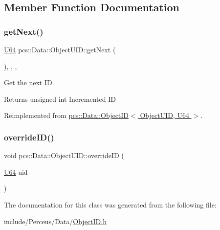 \subsection{Member Function Documentation}
\mbox{\label{classpcs_1_1Data_1_1ObjectUID_a1a1cc75b0ed7e6c04f2f5daa33e0193e}} 
\subsubsection{\texorpdfstring{get\+Next()}{getNext()}}
{\footnotesize\ttfamily \hyperlink{namespacepcs_1_1Data_a9aad6b21cf2fcd3515ecc3bbd069eb34}{U64} pcs\+::\+Data\+::\+Object\+U\+I\+D\+::get\+Next (\begin{DoxyParamCaption}{ }\end{DoxyParamCaption})\hspace{0.3cm}{\ttfamily [inline]}, {\ttfamily [override]}, {\ttfamily [private]}, {\ttfamily [virtual]}}



Get the next ID. 

\begin{DoxyReturn}{Returns}
unsigned int Incremented ID 
\end{DoxyReturn}


Reimplemented from \hyperlink{classpcs_1_1Data_1_1ObjectID_a01456dc5ee820984c83c089e413255ec}{pcs\+::\+Data\+::\+Object\+I\+D$<$ Object\+U\+I\+D, U64 $>$}.

\mbox{\label{classpcs_1_1Data_1_1ObjectUID_a8ceb01cdc531488d8033f7eeb07cb796}} 
\subsubsection{\texorpdfstring{override\+I\+D()}{overrideID()}}
{\footnotesize\ttfamily void pcs\+::\+Data\+::\+Object\+U\+I\+D\+::override\+ID (\begin{DoxyParamCaption}\item[{\hyperlink{namespacepcs_1_1Data_a9aad6b21cf2fcd3515ecc3bbd069eb34}{U64}}]{uid }\end{DoxyParamCaption})\hspace{0.3cm}{\ttfamily [inline]}}



The documentation for this class was generated from the following file\+:\begin{DoxyCompactItemize}
\item 
include/\+Perceus/\+Data/\hyperlink{ObjectID_8h}{Object\+I\+D.\+h}\end{DoxyCompactItemize}
